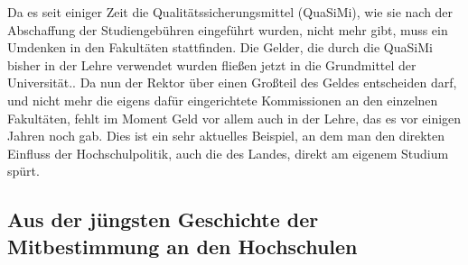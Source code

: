 Da es seit einiger Zeit die Qualitätssicherungsmittel (QuaSiMi), wie sie nach
der Abschaffung der Studiengebühren eingeführt wurden, nicht mehr gibt, muss
ein Umdenken in den Fakultäten stattfinden. Die Gelder, die durch die QuaSiMi
bisher in der Lehre verwendet wurden fließen jetzt in die Grundmittel der
Universität.. Da nun der Rektor über einen Großteil des Geldes entscheiden
darf, und nicht mehr die eigens dafür eingerichtete Kommissionen an den
einzelnen Fakultäten, fehlt im Moment Geld vor allem auch in der Lehre, das es
vor einigen Jahren noch gab.  Dies ist ein sehr aktuelles Beispiel, an dem man
den direkten Einfluss der Hochschulpolitik, auch die des Landes, direkt am
eigenem Studium spürt.

\subsection{Aus der jüngsten Geschichte der Mitbestimmung an den Hochschulen}


